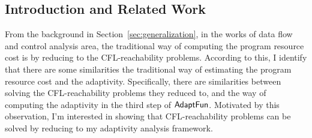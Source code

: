 \subsection{Introduction and Related Work}
\label{subsec:cfl-backgroung}
From the background in Section~\ref{sec:generalization},
in the works of data flow and control analysis area,
the traditional way of computing the program resource cost is
by reducing to the CFL-reachability problems.
%
According to this, 
I identify 
that there are some similarities the traditional way of estimating the program resource cost and 
the adaptivity.
Specifically, there are similarities between solving the CFL-reachability problems they reduced to,
 and the way of computing the adaptivity in 
the third step of $\textsf{AdaptFun}$.
 Motivated by this observation, 
 I'm interested in showing that
 CFL-reachability problems can be solved by reducing to my adaptivity analysis framework.

